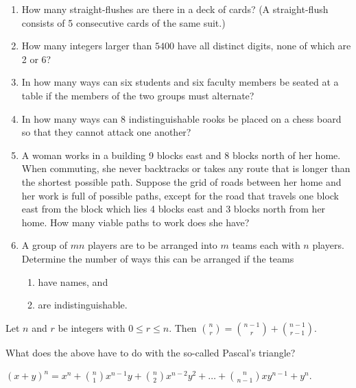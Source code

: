 \begin{exercises}\leavevmode
\begin{enumerate}
    \item How many straight-flushes are there in a deck of cards? (A straight-flush consists of 5 consecutive cards of the same suit.)
    \item How many integers larger than $5400$ have all distinct digits, none of which are 2 or 6?
    \item In how many ways can six students and six faculty members be seated at a table if the members of the two groups must alternate?
    \item In how many ways can 8 indistinguishable rooks be placed on a chess board so that they cannot attack one another?
    \item A woman works in a building 9 blocks east and 8 blocks north of her home.  When commuting, she never backtracks or takes any route that is longer than the shortest possible path.  Suppose the grid of roads between her home and her work is full of possible paths, except for the road that travels one block east from the block which lies 4 blocks east and 3 blocks north from her home.  How many viable paths to work does she have?
    \item A group of $mn$ players are to be arranged into $m$ teams each with $n$ players.  Determine the number of ways this can be arranged if the teams
    \begin{enumerate}
        \item have names, and
        \item are indistinguishable.
    \end{enumerate}
\end{enumerate}
\end{exercises}

\begin{theorem} Let $n$ and $r$ be integers with $0\leq r \leq n$.  Then ${{n}\choose{r}} = {{n-1}\choose{r}} + {{n-1}\choose{r-1}}$.
\end{theorem}

\begin{exercise} What does the above have to do with the so-called Pascal's triangle?
\end{exercise}

\begin{theorem} $(x+y)^n = x^n + {{n}\choose{1}} x^{n-1} y + {{n}\choose{2}} x^{n-2}y^2 + \ldots + {{n}\choose{n-1}} x y^{n-1} + y^n$.
\end{theorem}

